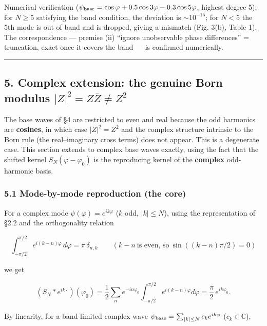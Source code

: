 \documentclass[
]{ltjsarticle}
\begin{document}
Numerical verification
(\(\psi_{\rm base}=\cos\varphi+0.5\cos3\varphi-0.3\cos5\varphi\),
highest degree 5): for \(N\ge5\) satisfying the band condition, the
deviation is \(\sim10^{-15}\); for \(N<5\) the 5th mode is out of band
and is dropped, giving a mismatch (Fig. 3(b), Table 1). The
correspondence --- premise (ii) ``ignore unobservable phase
differences'' = truncation, exact once it covers the band --- is
confirmed numerically.

\begin{center}\rule{0.5\linewidth}{0.5pt}\end{center}

\subsection{\texorpdfstring{5. Complex extension: the genuine Born
modulus
\(|Z|^2=Z\bar Z\ne Z^2\)}{5. Complex extension: the genuine Born modulus \textbar Z\textbar\^{}2=Z\textbackslash bar Z\textbackslash ne Z\^{}2}}\label{complex-extension-the-genuine-born-modulus-z2zbar-zne-z2}

The base waves of §4 are restricted to even and real because the odd
harmonics are \textbf{cosines}, in which case \(|Z|^2=Z^2\) and the
complex structure intrinsic to the Born rule (the real--imaginary cross
terms) does not appear. This is a degenerate case. This section extends
to complex base waves exactly, using the fact that the shifted kernel
\(S_N(\varphi-\varphi_0)\) is the reproducing kernel of the
\textbf{complex} odd-harmonic basis.

\subsubsection{5.1 Mode-by-mode reproduction (the
core)}\label{mode-by-mode-reproduction-the-core}

For a complex mode \(\psi(\varphi)=e^{ik\varphi}\) (\(k\) odd,
\(|k|\le N\)), using the representation of §2.2 and the orthogonality
relation

\[
\int_{-\pi/2}^{\pi/2}e^{i(k-n)\varphi}\,d\varphi=\pi\,\delta_{n,k}\qquad(k-n\ \text{is even, so}\ \sin((k-n)\pi/2)=0)
\]

we get

\[
(S_N*e^{ik\cdot})(\varphi_0)=\frac12\sum_{n}e^{-in\varphi_0}\!\int_{-\pi/2}^{\pi/2}\!e^{i(k-n)\varphi}d\varphi
=\frac{\pi}{2}\,e^{ik\varphi_0}.
\]

By linearity, for a band-limited complex wave
\(\psi_{\rm base}=\sum_{|k|\le N}c_k e^{ik\varphi}\)
(\(c_k\in\mathbb C\)),
\end{document}
